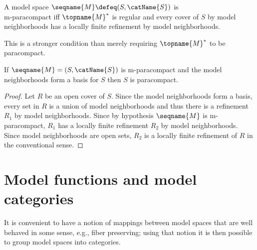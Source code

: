 \documentclass{article}
\begin{document}
\begin{definition}[m-paracompactness]
\label{def:M-para}
A model space $\seqname{M} \defeq (S, \catName{S})$ is \\
m-paracompact iff $\topname{M}^*$ is regular and every cover of $S$ by
model neighborhoods has a locally finite refinement by model neighborhoods.
\begin{remark}
This is a stronger condition than merely requiring $\topname{M}^*$ to
be paracompact.
\end{remark}
\end{definition}

\begin{theorem}
If $\seqname{M} = (S, \catName{S})$ is m-paracompact and the model
neighborhoods form a basis for $S$ then $S$ is paracompact.
\begin{proof}
Let $R$ be an open cover of $S$.  Since the model neighborhoods form a
basis, every set in $R$ is a union of model neighborhoods and thus there
is a refinement $R_1$ by model neighborhoods.  Since by hypothesis
$\seqname{M}$ is m-paracompact, $R_1$ has a locally finite refinement
$R_2$ by model neighborhoods.  Since model neighborhoods are open sets,
$R_2$ is a locally finite refinement of $R$ in the conventional sense.
\end{proof}
\end{theorem}

\section{Model functions and model categories}
\label{sec:modcat}
It is convenient to have a notion of mappings between model spaces that
are well behaved in some sense, e.g., fiber preserving; using that
notion it is then possible to group model spaces into categories.
\end{document}
